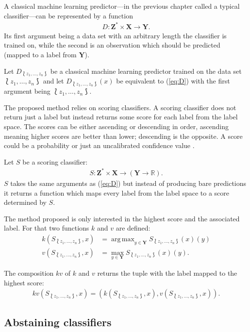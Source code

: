 \documentclass[twoside,11pt]{article}
\DeclareMathOperator*{\argmax}{arg\,max}
\def\ds{\Lbag z_1,\dots,z_n \Rbag}
\begin{document}
A classical machine learning predictor---in the previous
chapter called a typical classifier---can be represented
by a function
\begin{align}
  \label{eq:D}
  D: \textbf{Z}^* \times \textbf{X} \rightarrow \textbf{Y}.
\end{align}
Its first argument being a data set with an arbitrary
length the classifier is trained on, while the second is an
observation which should be predicted
(mapped to a label from $\textbf{Y}$).

Let $D_{\ds}$ be a classical machine
learning predictor trained on the data set $\ds$ and
let $D_{\ds}(x)$ be equivalent to (\ref{eq:D}) with the
first argument being $\ds$.

The proposed method relies on scoring classifiers.
A scoring classifier does not return just
a label but instead returns some score for each label from
the label space.
The scores can be either ascending or descending in order,
ascending meaning higher scores are better than lower;
descending is the opposite.
A score could be a probability or just an uncalibrated
confidence value \citep[see][]{vanderlooy_et_al_2009}.

Let $S$ be a scoring classifier:
\begin{align}
  \label{eq:S}
  S: \textbf{Z}^* \times \textbf{X} \rightarrow
     (\textbf{Y} \rightarrow \mathbb{R}).
\end{align}
$S$ takes the same arguments as (\ref{eq:D}) but instead
of producing bare predictions it returns a function which
maps every label from the label space to a score
determined by $S$.

The method proposed is only interested in the highest
score and the associated label. For that two functions
$k$ and $v$ are defined:
\begin{align*}
  k(S_{\ds}, x) &= \argmax_{y \in \textbf{Y}}
    S_{\ds}(x)(y) \\
  v(S_{\ds}, x) &= \max_{y \in \textbf{Y}}
    S_{\ds}(x)(y).
\end{align*}

The composition $kv$ of $k$ and $v$ returns the tuple with
the label mapped to the highest score:
\begin{align}
  \label{eq:kv}
  kv(S_{\ds}, x) = (k(S_{\ds}, x), v(S_{\ds}, x)).
\end{align}

\subsection{Abstaining classifiers}
\end{document}
